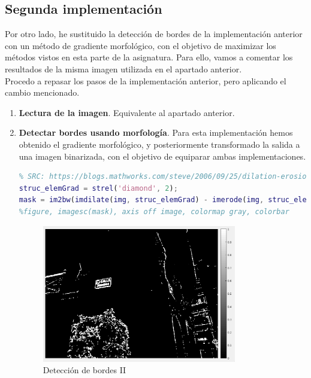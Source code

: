 \documentclass[12pt]{article}
\begin{document}
	\pagebreak

	\subsection{Segunda implementación}
	\noindent Por otro lado, he sustituido la detección de bordes de la implementación anterior con un método de gradiente morfológico, con el objetivo de maximizar los métodos vistos en esta parte de la asignatura. Para ello, vamos a comentar los resultados de la misma imagen utilizada en el apartado anterior. \\
	
	\noindent Procedo a repasar los pasos de la implementación anterior, pero aplicando el cambio mencionado.
	
	\begin{enumerate}
		\item \textbf{Lectura de la imagen}. Equivalente al apartado anterior. \\
		
		\item \textbf{Detectar bordes usando morfología}. Para esta implementación hemos obtenido el gradiente morfológico, y posteriormente transformado la salida a una imagen binarizada, con el objetivo de equiparar ambas implementaciones.
		
		\begin{lstlisting}[language=matlab, caption={Deteccion de bordes II}]
% Detecctar bordes (gradiente morfologico)
% SRC: https://blogs.mathworks.com/steve/2006/09/25/dilation-erosion-and-the-morphological-gradient/
struc_elemGrad = strel('diamond', 2);
mask = im2bw(imdilate(img, struc_elemGrad) - imerode(img, struc_elemGrad));
%figure, imagesc(mask), axis off image, colormap gray, colorbar
		\end{lstlisting}
	
		\begin{figure}[h!]
			\begin{center}
				\includegraphics[width=0.8\textwidth]{img/impl_9.png}
				\caption{Detección de bordes II}
				\label{img: bordes II}
			\end{center}
		\end{figure}
	

\end{enumerate}
\end{document}
